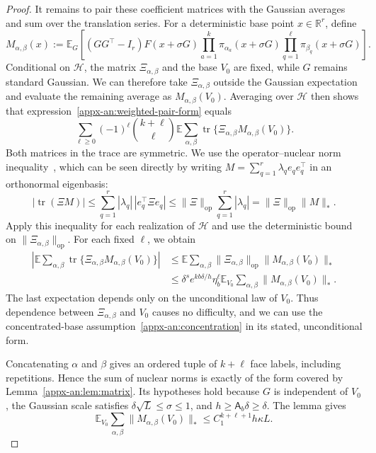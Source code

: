 \documentclass[11pt,letterpaper]{article}
\theoremstyle{remark}
\newcommand{\E}{\mathbb E}
\newcommand{\R}{\mathbb R}
\newcommand{\tr}{\operatorname{tr}}
\newcommand{\op}{\mathrm{op}}
\begin{document}
\begin{proof}
It remains to pair these coefficient matrices with the Gaussian
averages and sum over the translation series. For a deterministic
base point $x\in\R^r$, define
\[
 M_{\alpha,\beta}(x):=
 \E_G\left[(GG^\top-I_r)F(x+\sigma G)
       \prod_{a=1}^k\pi_{\alpha_a}(x+\sigma G)
       \prod_{q=1}^\ell\pi_{\beta_q}(x+\sigma G)\right].
\]
Conditional on $\mathcal H$, the matrix $\Xi_{\alpha,\beta}$
and the base $V_0$ are fixed, while $G$ remains standard Gaussian.
We can therefore take $\Xi_{\alpha,\beta}$ outside the Gaussian
expectation and evaluate the remaining average as
$M_{\alpha,\beta}(V_0)$. Averaging over $\mathcal H$ then shows
that expression~\eqref{appx-an:weighted-pair-form} equals
\[
 \sum_{\ell\ge0}(-1)^\ell\binom{k+\ell}{\ell}
       \E\sum_{\alpha,\beta}
       \tr\{\Xi_{\alpha,\beta}M_{\alpha,\beta}(V_0)\}.
\]
Both matrices in the trace are symmetric. We use the
operator--nuclear norm inequality~\cite[Chapter~IV]{Bhatia1997},
which can be seen directly by writing
$M=\sum_{q=1}^r\lambda_q e_qe_q^\top$ in an orthonormal
eigenbasis:
\[
 |\tr(\Xi M)|
 \le\sum_{q=1}^r|\lambda_q|\,|e_q^\top\Xi e_q|
 \le\|\Xi\|_{\op}\sum_{q=1}^r|\lambda_q|
 =\|\Xi\|_{\op}\|M\|_*.
\]
Apply this inequality for each realization of $\mathcal H$
and use the deterministic bound on $\|\Xi_{\alpha,\beta}\|_{\op}$.
For each fixed $\ell$, we obtain
\[
 \begin{aligned}
 \left|\E\sum_{\alpha,\beta}
       \tr\{\Xi_{\alpha,\beta}M_{\alpha,\beta}(V_0)\}\right|
 &\le\E\sum_{\alpha,\beta}
       \|\Xi_{\alpha,\beta}\|_{\op}
       \|M_{\alpha,\beta}(V_0)\|_*\\
 &\le\delta^s e^{kb\delta/h}\eta_b^\ell
       \E_{V_0}\sum_{\alpha,\beta}
       \|M_{\alpha,\beta}(V_0)\|_*.
 \end{aligned}
\]
The last expectation depends only on the unconditional law of
$V_0$. Thus dependence between $\Xi_{\alpha,\beta}$ and $V_0$
causes no difficulty, and we can use the concentrated-base
assumption~\eqref{appx-an:concentration} in its stated,
unconditional form.

Concatenating $\alpha$ and $\beta$ gives an ordered tuple of
$k+\ell$ face labels, including repetitions. Hence the sum of
nuclear norms is exactly of the form covered by
Lemma~\ref{appx-an:lem:matrix}. Its hypotheses hold because
$G$ is independent of $V_0$, the Gaussian scale satisfies
$\delta\sqrt L\le\sigma\le1$, and
$h\ge\mathsf A_b\delta\ge\delta$. The lemma gives
\[
 \E_{V_0}\sum_{\alpha,\beta}\|M_{\alpha,\beta}(V_0)\|_*
 \le C_1^{k+\ell+1}h\kappa L.
\]


\end{proof}
\end{document}
